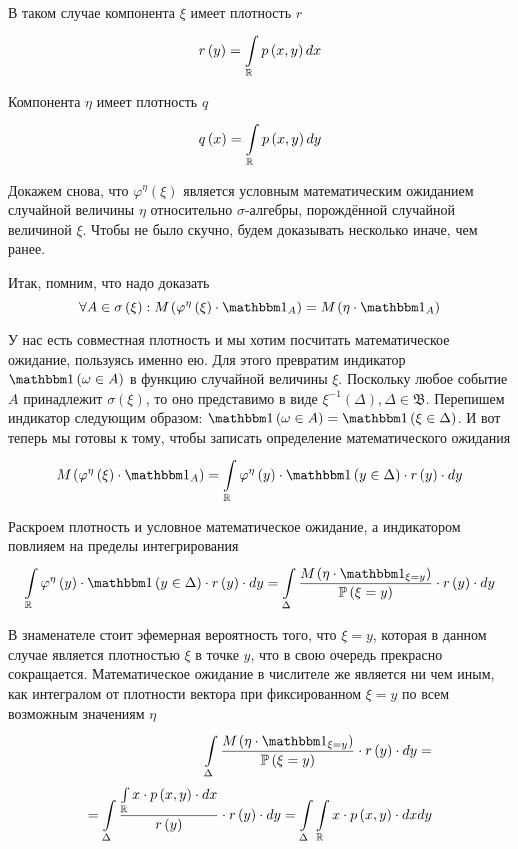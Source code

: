 В таком случае компонента $\xi$ имеет плотность $r$
$$r\left( y \right) = \integral{\mathbb{R}}{}{x}{\pdf{x,y}}$$

Компонента $\eta$ имеет плотность $q$
$$q\left( x \right) = \integral{\mathbb{R}}{}{y}{\pdf{x,y}}$$

Докажем снова, что $\varphi^\eta\left( \xi \right)$ является
условным математическим ожиданием случайной величины $\eta$
относительно $\sigma$-алгебры, порождённой случайной величиной $\xi$.
Чтобы не было скучно, будем доказывать несколько иначе, чем ранее.

Итак, помним, что надо доказать
\begin{equation}\label{conditionalExpectationContinualStart}
    \forall A \in \sigma\left( \xi \right):
        \mean{\left( \varphi^{\eta}\left( \xi \right)
            \cdot \indicatorof{A} \right)}
            = \mean{\left( \eta \cdot \indicatorof{A} \right)}
\end{equation}

У нас есть совместная плотность и мы хотим посчитать математическое ожидание,
пользуясь именно ею.
Для этого превратим индикатор $\indicator{\omega \in A}$
в функцию случайной величины $\xi$.
Поскольку любое событие $A$ принадлежит $\sigma\left( \xi \right)$,
то оно представимо в виде
$\xi^{-1}\left( \Delta \right), \Delta \in \mathfrak{B}$.
Перепишем индикатор следующим образом:
$\indicator{\omega \in A} = \indicator{\xi \in \Delta}$.
И вот теперь мы готовы к тому,
чтобы записать определение математического ожидания
$$\mean{\left( \varphi^{\eta}\left( \xi \right) \cdot \indicatorof{A} \right)}
    = \integral{\mathbb{R}}{}{y}{
        \varphi^{\eta}\left( y \right) \cdot \indicator{y \in \Delta}
            \cdot r\left( y \right) \cdot}$$

Раскроем плотность и условное математическое ожидание,
а индикатором повлияем на пределы интегрирования
$$\integral{\mathbb{R}}{}{y}{
    \varphi^{\eta}\left( y \right) \cdot \indicator{y \in \Delta}
            \cdot r\left( y \right) \cdot}
    = \integral{\Delta}{}{y}{
        \frac{\mean{\left( \eta \cdot \indicatorof{\xi=y} \right)}}
            {\probability{\xi = y}}
        \cdot r\left( y \right) \cdot}$$

В знаменателе стоит эфемерная вероятность того, что $\xi = y$,
которая в данном случае является плотностью $\xi$ в точке $y$,
что в свою очередь прекрасно сокращается.
Математическое ожидание в числителе же является ни чем иным,
как интегралом от плотности вектора при фиксированном $\xi=y$
по всем возможным значениям $\eta$
\begin{align*}
    \integral{\Delta}{}{y}{
        \frac{\mean{\left( \eta \cdot \indicatorof{\xi=y} \right)}}
            {\probability{\xi = y}}
        \cdot r\left( y \right) \cdot} = \\
        = \integral{\Delta}{}{y}{
            \frac{\integral{\mathbb{R}}{}{x}{x \cdot \pdf{x,y} \cdot}}
                {r\left( y \right)} \cdot r\left( y \right) \cdot}
        = \integral{\Delta}{}{y}{\integral{\mathbb{R}}{}{x}{
            x \cdot \pdf{x,y} \cdot}}
\end{align*}

